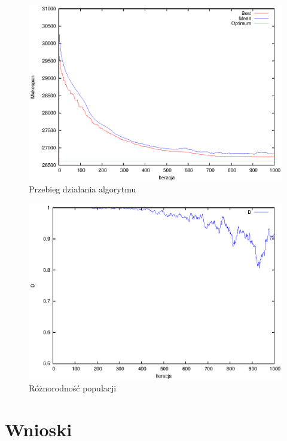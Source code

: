 \documentclass[11pt, a4wide]{article}
\begin{document}
\begin{figure}[H]
\caption{Przebieg działania algorytmu}
\label{progress}
\begin{center}
  \includegraphics{progres.eps}
\end{center}
\end{figure}


\begin{figure}[H]
\caption{Różnorodność populacji}
\label{diversity}
\begin{center}
  \includegraphics{diversity.eps}
\end{center}
\end{figure}





\section{Wnioski}  
\end{document}

